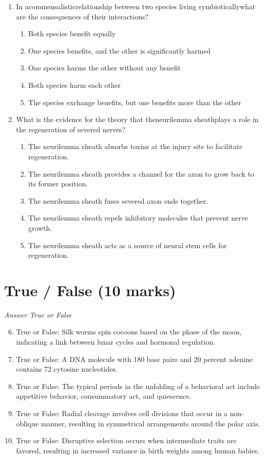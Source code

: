 \documentclass[12pt]{article}
\begin{document}
\begin{enumerate}[label=\arabic*.]
\begin{enumerate}[label=(\alph*)]
\end{enumerate}
\item In acommensalisticrelationship between two species living symbioticallywhat are the
consequences of their interactions?
\begin{enumerate}[label=(\alph*)]
    \item Both species benefit equally
    \item One species benefits, and the other is significantly harmed
    \item One species harms the other without any benefit
    \item Both species harm each other
    \item The species exchange benefits, but one benefits more than the other
\end{enumerate}
\item What is the evidence for the theory that theneurilemma sheathplays a role in the
regeneration of severed nerves?
\begin{enumerate}[label=(\alph*)]
    \item The neurilemma sheath absorbs toxins at the injury site to facilitate regeneration.
    \item The neurilemma sheath provides a channel for the axon to grow back to its former position.
    \item The neurilemma sheath fuses severed axon ends together.
    \item The neurilemma sheath repels inhibitory molecules that prevent nerve growth.
    \item The neurilemma sheath acts as a source of neural stem cells for regeneration.
\end{enumerate}
\end{enumerate}

\section*{True / False (10 marks)}
\textit{Answer True or False}
\begin{enumerate}[label=\arabic*.]
\setcounter{enumi}{5}
\item True or False: Silk worms spin cocoons based on the phase of the moon, indicating a link between lunar cycles and hormonal regulation.
\item True or False: A DNA molecule with 180 base pairs and 20 percent adenine contains 72 cytosine nucleotides.
\item True or False: The typical periods in the unfolding of a behavioral act include appetitive behavior, consummatory act, and quiescence.
\item True or False: Radial cleavage involves cell divisions that occur in a non-oblique manner, resulting in symmetrical arrangements around the polar axis.
\item True or False: Disruptive selection occurs when intermediate traits are favored, resulting in increased variance in birth weights among human babies.
\end{enumerate}
\end{document}
